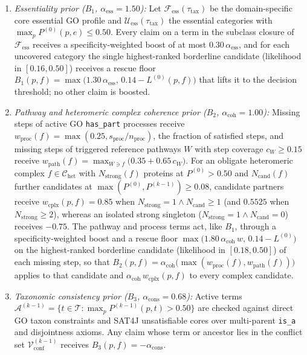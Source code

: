 \documentclass[10pt,twocolumn]{article}
\begin{document}
\begin{enumerate}
  \item \textit{Essentiality prior ($B_1$, $\alpha_{\text{ess}} = 1.50$):} Let $\mathcal{F}_{\text{ess}}(\tau_{\text{tax}})$ be the domain-specific core essential GO profile and $\mathcal{U}_{\text{ess}}(\tau_{\text{tax}})$ the essential categories with $\max_p P^{(0)}(p, e) \le 0.50$. Every claim on a term in the subclass closure of $\mathcal{F}_{\text{ess}}$ receives a specificity-weighted boost of at most $0.30\,\alpha_{\text{ess}}$, and for each uncovered category the single highest-ranked borderline candidate (likelihood in $[0.16, 0.50]$) receives a rescue floor $B_1(p, f) = \max\bigl(1.30\,\alpha_{\text{ess}},\, 0.14 - L^{(0)}(p, f)\bigr)$ that lifts it to the decision threshold; no other claim is boosted.
  \item \textit{Pathway and heteromeric complex coherence prior ($B_2$, $\alpha_{\text{coh}} = 1.00$):} Missing steps of active GO \texttt{has\_part} processes receive $w_{\text{proc}}(f) = \max(0.25, s_{\text{proc}}/n_{\text{proc}})$, the fraction of satisfied steps, and missing steps of triggered reference pathways $W$ with step coverage $c_W \ge 0.15$ receive $w_{\text{path}}(f) = \max_{W \ni f}\bigl(0.35 + 0.65\,c_W\bigr)$. For an obligate heteromeric complex $f \in \mathcal{C}_{\text{het}}$ with $N_{\text{strong}}(f)$ proteins at $P^{(0)} > 0.50$ and $N_{\text{cand}}(f)$ further candidates at $\max(P^{(0)}, P^{(k-1)}) \ge 0.08$, candidate partners receive $w_{\text{cplx}}(p, f) = 0.85$ when $N_{\text{strong}} = 1 \wedge N_{\text{cand}} \ge 1$ (and $0.5525$ when $N_{\text{strong}} \ge 2$), whereas an isolated strong singleton ($N_{\text{strong}} = 1 \wedge N_{\text{cand}} = 0$) receives $-0.75$. The pathway and process terms act, like $B_1$, through a specificity-weighted boost and a rescue floor $\max\bigl(1.80\,\alpha_{\text{coh}}\,w,\, 0.14 - L^{(0)}\bigr)$ on the highest-ranked borderline candidate (likelihood in $[0.18, 0.50]$) of each missing step, so that $B_2(p, f) = \alpha_{\text{coh}}\bigl(\max(w_{\text{proc}}(f), w_{\text{path}}(f))\bigr)$ applies to that candidate and $\alpha_{\text{coh}}\,w_{\text{cplx}}(p, f)$ to every complex candidate.
  \item \textit{Taxonomic consistency prior ($B_3$, $\alpha_{\text{cons}} = 0.68$):} Active terms $\mathcal{A}^{(k-1)} = \{t \in \mathcal{T} : \max_p P^{(k-1)}(p, t) > 0.50\}$ are checked against direct GO taxon constraints and SAT4J unsatisfiable cores over multi-parent \texttt{is\_a} and disjointness axioms. Any claim whose term or ancestor lies in the conflict set $\mathcal{V}_{\text{conf}}^{(k-1)}$ receives $B_3(p, f) = -\alpha_{\text{cons}}$.

\end{enumerate}
\end{document}
